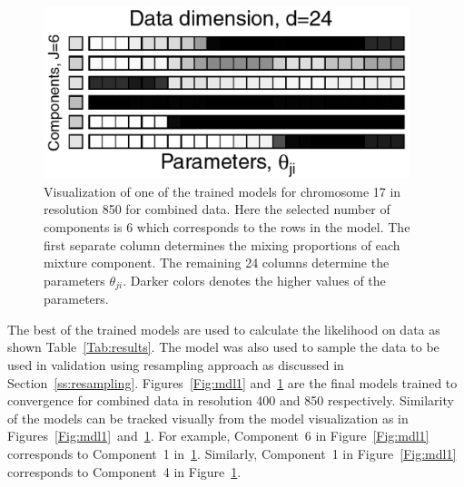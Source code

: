  \begin{figure}[h!]
 \centering
 \includegraphics[width=0.95\textwidth]{figures/mdlchr17dm850}
 \caption[Final Trained Model in chromosome 17 and resolution 850]{Visualization of one of the trained models for chromosome 17 in resolution 850 for combined data. Here the selected number of components is 6 which corresponds to the rows in the model. The first separate column determines the mixing proportions of each mixture component. The remaining 24 columns determine the parameters $\theta_{ji}$. Darker colors denotes the higher values of the parameters.}\label{Fig:mdl2}
 \end{figure}

The best of the trained models are used to calculate the likelihood on data as shown Table~\ref{Tab:results}. The model was also used to sample the data to be used in validation using resampling approach as discussed in Section~\ref{ss:resampling}. Figures~\ref{Fig:mdl1} and~\ref{Fig:mdl2} are the final models trained to convergence for combined data in resolution 400 and 850 respectively. Similarity of the models can be tracked visually from the model visualization as in Figures~\ref{Fig:mdl1}~and~\ref{Fig:mdl2}. For example, Component~6 in Figure~\ref{Fig:mdl1} corresponds to Component~1 in~\ref{Fig:mdl2}. Similarly, Component~1 in Figure~\ref{Fig:mdl1} corresponds to Component~4 in Figure~\ref{Fig:mdl2}.
 
